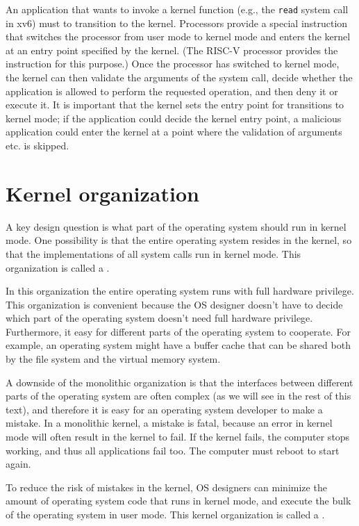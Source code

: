 An application that wants to invoke a kernel function (e.g., the
\lstinline{read}
system call in xv6) must to
transition to the kernel.  Processors provide a special instruction that switches the
processor from user mode to kernel mode and enters the kernel at an entry point
specified by the kernel.  (The RISC-V
processor provides the 
instruction for this purpose.)  Once the processor has switched to kernel mode,
the kernel can then validate the arguments of the system call, decide whether
the application is allowed to perform the requested operation, and then deny it
or execute it.  It is important that the kernel sets the entry point for
transitions to kernel mode; if the application could decide the kernel entry
point, a malicious application could enter the kernel at a point where the
validation of arguments etc. is skipped.
\section{Kernel organization}

A key design question is what part of the operating
system should run in kernel mode. 
One possibility is that the entire operating system resides
in the kernel, so that the implementations of all system calls
run in kernel mode.
This organization is called a
.

In this organization the entire operating system runs with full hardware
privilege. This organization is convenient because the OS designer doesn't have
to decide which part of the operating system doesn't need full hardware
privilege.  Furthermore, it easy for different parts of the operating system to
cooperate.  For example, an operating system might have a buffer cache that can
be shared both by the file system and the virtual memory system. 

A downside of the monolithic organization is that the interfaces between
different parts of the operating system are often complex (as we will see in the
rest of this text), and therefore it is easy for an operating system developer
to make a mistake.  In a monolithic kernel, a mistake is fatal, because an error
in kernel mode will often result in the kernel to fail.  If the kernel fails,
the computer stops working, and thus all applications fail too.  The computer
must reboot to start again.

To reduce the risk of mistakes in the kernel, OS designers can minimize the
amount of operating system code that runs in kernel mode, and execute the
bulk of the operating system in user mode.
This kernel organization is called a
.


